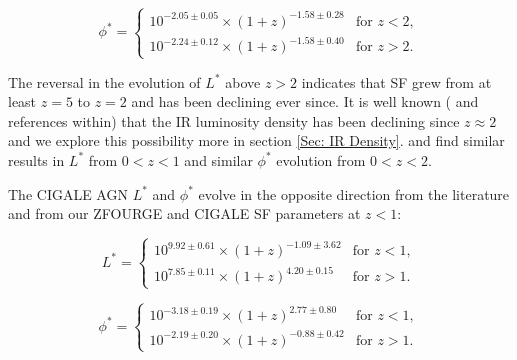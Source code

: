 \begin{equation*}
    \phi^{*} =
    \begin{cases} 
        10^{-2.05 \pm 0.05} \times (1+z)^{-1.58 \pm 0.28} & \text{for } z < 2, \\
        10^{-2.24 \pm 0.12} \times (1+z)^{-1.58 \pm 0.40} & \text{for } z > 2.
    \end{cases}
\end{equation*}

The reversal in the evolution of $L^{*}$ above $z>2$ indicates that SF grew from at least $z=5$ to $z=2$ and has been declining ever since. It is well known (\citealp{gruppioni_herschel_2013,  madau_cosmic_2014} and references within) that the IR luminosity density has been declining since $z\approx2$ and we explore this possibility more in section \ref{Sec: IR Density}. \cite{gruppioni_herschel_2013} and \cite{magnelli_deepest_2013} find similar results in $L^{*}$ from $0<z<1$ and similar $\phi^{*}$ evolution from $0<z<2$. 


The CIGALE AGN $L^{*}$ and $\phi^{*}$ evolve in the opposite direction from the literature and from our ZFOURGE and CIGALE SF parameters at $z<1$:

\begin{equation*}
    L^{*} =
    \begin{cases} 
        10^{9.92 \pm 0.61} \times (1+z)^{-1.09 \pm 3.62} & \text{for } z < 1, \\
        10^{7.85 \pm 0.11} \times (1+z)^{4.20 \pm 0.15} & \text{for } z > 1.
    \end{cases}
\end{equation*}

\begin{equation*}
    \phi^{*} =
    \begin{cases} 
        10^{-3.18 \pm 0.19} \times (1+z)^{2.77 \pm 0.80} & \text{for } z < 1, \\
        10^{-2.19 \pm 0.20} \times (1+z)^{-0.88 \pm 0.42} & \text{for } z > 1.
    \end{cases}
\end{equation*}


